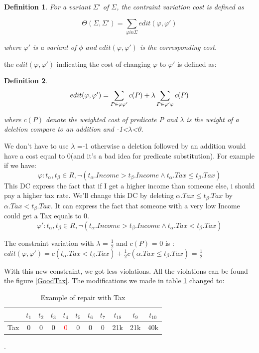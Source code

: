 \documentclass[letterpaper, 12pt]{report}
\newtheorem{mydef}{Definition}
\begin{document}
\begin{mydef}
For a variant $\Sigma '$ of $\Sigma$, the contraint variation cost is defined as

$$\Theta (\Sigma,\Sigma ') = \sum_{\varphi in \Sigma} edit(\varphi,\varphi ')$$

\hspace*{2cm} where $\varphi '$ is a variant of $\phi$ and $edit(\varphi,\varphi ')$ is the corresponding cost.
\end{mydef}

the $edit(\varphi , \varphi ')$ indicating the cost of changing $\varphi$ to $\varphi'$ is defined as:
\begin{mydef}
$$
 edit(\varphi, \varphi') = \sum_{P \in \varphi \\ \varphi'} c(P) + \lambda \sum_{P \in \varphi' \\ \varphi} c(P)$$
 
where $c(P)$ denote the weighted cost of predicate P and $\lambda$ is the weight of a deletion compare to an addition and -1<$\lambda$<0.
\end{mydef}

We don't have to use $\lambda$ =-1 otherwise a deletion followed by an addition would have a cost equal to 0(and it's a bad idea for predicate substitution). For example if we have:
$$ \varphi : t_\alpha,t_\beta \in R, \neg(t_\alpha.Income > t_\beta.Income \wedge t_\alpha.Tax \leq t_\beta.Tax)$$
This DC express the fact that if I get a higher income than someone else, i should pay a higher tax rate. We'll change this DC by deleting $\alpha.Tax \leq t_\beta.Tax$ by $\alpha.Tax < t_\beta.Tax$. It can express the fact that someone with a very low Income could get a Tax equals to 0.
$$ \varphi ' : t_\alpha,t_\beta \in R, \neg(t_\alpha.Income > t_\beta.Income \wedge t_\alpha.Tax < t_\beta.Tax)$$

The constraint variation with $\lambda$ = $\frac{1}{2}$ and $c(P)$ = 0 is : $edit(\varphi, \varphi') = c(t_\alpha.Tax < t_\beta.Tax) + \frac{1}{2} c(\alpha.Tax \leq t_\beta.Tax)$ = $\frac{1}{2}$

With this new constraint, we got less violations. All the violations can be found the figure \ref{GoodTax}. The modifications we made in table \ref{tableExample} changed to:

\begin{table}[H]
	\centering
	\begin{tabular}{|c|c c c c c c c c c c|}
	\hline
	   & $t_1$ & $t_2$ & $t_3$ &$t_4$ &$t_5$ &$t_6$ &$t_7$ &$t_18$ &$t_9$ &$t_10$ \\
	\hline
	 Tax & 0 & 0 & 0 & \textcolor{red}{0} & 0 & 0 & 0 & 21k & 21k & 40k\\
	 \hline
	\end{tabular}
	\caption{\label{tableExample} Example of repair with Tax}.
\end{table}
\end{document}
